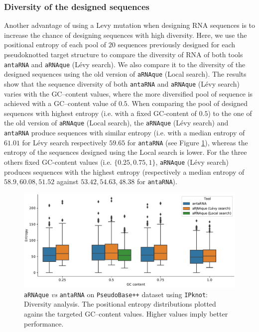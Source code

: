 \subsubsection{Diversity of the designed sequences}
Another advantage of using a Levy mutation when designing RNA sequences is to increase the chance of designing sequences with high diversity. Here, we use the positional entropy of each pool of $20$ sequences previously designed for each pseudoknotted target structure to compare the diversity of RNA of both tools \texttt{antaRNA} and \texttt{aRNAque} (Lévy search). We also compare it to the diversity of the designed sequences using the old version of \texttt{aRNAque} (Local search). The results show that the sequence diversity of both \texttt{antaRNA} and \texttt{aRNAque} (Lévy search) varies with the GC--content values, where the more diversified pool of sequence is achieved with a GC--content value of $0.5$. When comparing the pool of designed sequences with highest entropy (i.e. with a fixed GC-content of $0.5$) to the one of the old version of \texttt{aRNAque} (Local search), the \texttt{aRNAque} (Lévy search) and \texttt{antaRNA} produce sequences with similar entropy (i.e. with a median entropy of $61.01$ for Lévy search respectively $59.65$ for \texttt{antaRNA} (see Figure \ref{Fig:result_diversity}), whereas the entropy of the sequences designed using the Local search is lower. For the three others fixed GC-content values (i.e. $\{0.25, 0.75, 1 \}$, \texttt{aRNAque} (Lévy search) produces sequences with the highest entropy (respectively a median entropy of $58.9, 60.08, 51.52$ against  $53.42, 54.63, 48.38$ for \texttt{antaRNA}).
\begin{figure}[ht]
	\includegraphics[width=1.0\linewidth]{../res/images/arnaque/fig7.pdf}
	\caption{\texttt{aRNAque} \emph{vs} \texttt{antaRNA} on \texttt{PseudoBase++} dataset using \texttt{IPknot}: Diversity analysis. The positional entropy distributions plotted agains the targeted GC--content values.  Higher values imply better performance.}\label{Fig:result_diversity}
\end{figure}
